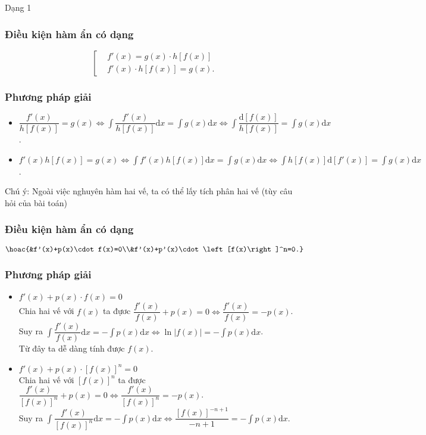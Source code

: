 \begin{dang}{Dạng 1}
\subsubsection{Điều kiện hàm ẩn có dạng}
	$$\left[ \begin{aligned}
		& f'(x)=g(x)\cdot h\left[ f(x) \right] \\ 
		& f'(x)\cdot h\left[ f(x) \right]=g(x). 
	\end{aligned} \right.$$
\subsubsection*{Phương pháp giải}
	\begin{itemize}[\color{blue}\faPencilSquareO]
		\item $\dfrac{f'(x)}{h[f(x)]}=g(x) \Leftrightarrow \displaystyle\int\!\dfrac{f'(x)}{h[f(x)]}\mathrm{d}x =\int\!\!{g(x)}\mathrm{d}x \Leftrightarrow \int\dfrac{\mathrm{d}\left[ f(x) \right]}{h\left[ f(x) \right]} =\int\!\!{g(x)\mathrm{d}x}$.
		\item $f'(x)h[f(x)]=g(x)
		\Leftrightarrow 
		\displaystyle\int\!f'(x)h[f(x)]\mathrm{d}x=\int\!\!g(x)\mathrm{d}x
		\Leftrightarrow 
		\int\!h[f(x)]\mathrm{d}\left[ f'(x) \right]=\int\!\!g(x)\mathrm{d}x$.
	\end{itemize}
	Chú ý: Ngoài việc nghuyên hàm hai vế, ta có thể lấy tích phân hai vế (tùy câu hỏi của bài toán)
\subsubsection{Điều kiện hàm ẩn có dạng}
	$$\hoac{&f'(x)+p(x)\cdot f(x)=0\\&f'(x)+p'(x)\cdot\left[f(x)\right]^n=0.}$$
\subsubsection*{Phương pháp giải}
	\begin{itemize}[\color{magenta}\faPencilSquareO]
		\item $f'(x)+p(x)\cdot f(x)=0$\\
		Chia hai vế với $f(x)$ ta đựơc $\dfrac{f'(x)}{f(x)}+p(x)=0 \Leftrightarrow \dfrac{f'(x)}{f(x)}=-p(x)$.\\
		Suy ra $\displaystyle\int\!\dfrac{f'(x)}{f(x)}\mathrm{d}x=-\int\!\!p(x)\mathrm{d}x \Leftrightarrow \ln |f(x)|=-\int\!\!p(x)\mathrm{d}x$.\\
		Từ đây ta dễ dàng tính được $f(x)$.
		\item $f'(x)+p(x)\cdot \left[ f(x) \right]^n=0$ \\
		Chia hai vế với $\left[ f(x) \right]^n$ ta được $\dfrac{f'(x)}{\left[ f(x) \right]^n}+p(x)=0 \Leftrightarrow \dfrac{f'(x)}{\left[ f(x) \right]^n}=-p(x)$.\\
		Suy ra $\displaystyle\int\!\dfrac{f'(x)}{\left[ f(x) \right]^n}\mathrm{d}x =-\int\!\!p(x)\mathrm{d}x \Leftrightarrow \dfrac{\left[ f(x) \right]^{-n+1}}{-n+1} =-\int\!\!p(x)\mathrm{d}x$.
	\end{itemize}

\end{dang}
